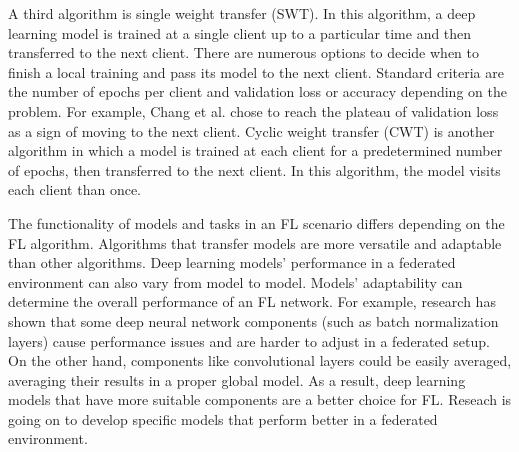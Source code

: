 



A third algorithm is single weight transfer (SWT). In this algorithm, a deep learning model is trained at a single client up to a particular time and then transferred to the next client. There are numerous options to decide when to finish a local training and pass its model to the next client.  Standard criteria are the number of epochs per client and validation loss or accuracy depending on the problem. For example,  Chang et al. \cite{chang2018distributed} chose to reach the plateau of validation loss as a sign of moving to the next client.  Cyclic weight transfer (CWT) is another algorithm in which a model is trained at each client for a predetermined number of epochs, then transferred to the next client. In this algorithm, the model visits each client than once. 

The functionality of models and tasks in an FL scenario differs depending on the FL algorithm. Algorithms that transfer models are more versatile and adaptable than other algorithms. Deep learning models' performance in a federated environment can also vary from model to model. Models' adaptability can determine the overall performance of an FL network. For example, research has shown that some deep neural network components (such as batch normalization layers) cause performance issues and are harder to adjust in a federated setup. On the other hand, components like convolutional layers could be easily averaged, averaging their results in a proper global model.  As a result, deep learning models that have more suitable components are a better choice for FL. Reseach is going on to develop specific models that perform better in a federated environment\cite{li2021fedbn}.



